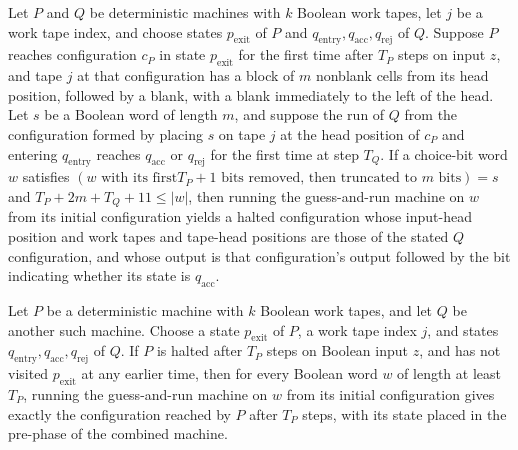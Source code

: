\begin{theorem}
\label{Turing.guessRunTM_runWith}
\leanok
{}
Let $P$ and $Q$ be deterministic machines with $k$ Boolean work tapes, let $j$ be a work
tape index, and choose states $p_{\mathrm{exit}}$ of $P$ and
$q_{\mathrm{entry}},q_{\mathrm{acc}},q_{\mathrm{rej}}$ of $Q$. Suppose $P$ reaches
configuration $c_P$ in state $p_{\mathrm{exit}}$ for the first time after $T_P$ steps on
input $z$, and tape $j$ at that configuration has a block of $m$ nonblank cells from its
head position, followed by a blank, with a blank immediately to the left of the head.
Let $s$ be a Boolean word of length $m$, and suppose the run of $Q$ from the
configuration formed by placing $s$ on tape $j$ at the head position of $c_P$ and
entering $q_{\mathrm{entry}}$ reaches $q_{\mathrm{acc}}$ or $q_{\mathrm{rej}}$ for the
first time at step $T_Q$. If a choice-bit word $w$ satisfies $(w\text{ with its first
}T_P+1\text{ bits removed, then truncated to }m\text{ bits})=s$ and $T_P+2m+T_Q+11\le
|w|$, then running the guess-and-run machine on $w$ from its initial configuration
yields a halted configuration whose input-head position and work tapes and tape-head
positions are those of the stated $Q$ configuration, and whose output is that
configuration's output followed by the bit indicating whether its state is
$q_{\mathrm{acc}}$.
\end{theorem}

\begin{theorem}
\label{Turing.guessRunTM_runWith_setup_halt}
\leanok
{}
Let $P$ be a deterministic machine with $k$ Boolean work tapes, and let $Q$ be another
such machine. Choose a state $p_{\mathrm{exit}}$ of $P$, a work tape index $j$, and
states $q_{\mathrm{entry}},q_{\mathrm{acc}},q_{\mathrm{rej}}$ of $Q$. If $P$ is halted
after $T_P$ steps on Boolean input $z$, and has not visited $p_{\mathrm{exit}}$ at any
earlier time, then for every Boolean word $w$ of length at least $T_P$, running the
guess-and-run machine on $w$ from its initial configuration gives exactly the
configuration reached by $P$ after $T_P$ steps, with its state placed in the pre-phase
of the combined machine.
\end{theorem}

